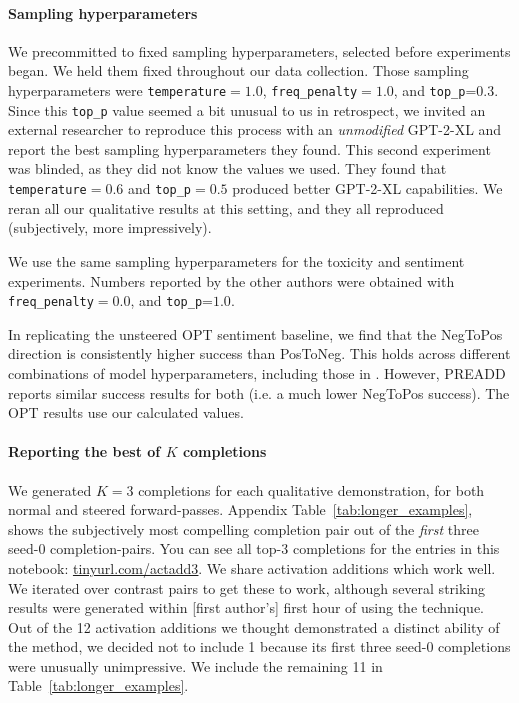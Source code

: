\documentclass{article}
\theoremstyle{plain}
\theoremstyle{definition}
\theoremstyle{remark}
\begin{document}
\paragraph{Sampling hyperparameters} We precommitted to fixed sampling hyperparameters, selected before experiments began. We held them fixed throughout our data collection. Those sampling hyperparameters were \texttt{temperature}$=1.0$, \texttt{freq\_penalty}$=1.0$, and \texttt{top\_p}=$0.3$. 
Since this \texttt{top\_p} value seemed a bit unusual to us in retrospect, we invited an external researcher
to reproduce this process with an \textit{unmodified} GPT-2-XL and report the best sampling hyperparameters they found. This second experiment was blinded, as they did not know the values we used. They found that \texttt{temperature}$=0.6$ and \texttt{top\_p}$=0.5$ produced better GPT-2-XL capabilities. We reran all our qualitative results at this setting, and they all reproduced (subjectively, more impressively).

We use the same sampling hyperparameters for the toxicity and sentiment experiments. Numbers reported by the other authors were obtained with \texttt{freq\_penalty}$=0.0$, and \texttt{top\_p}=$1.0$.

In replicating the unsteered OPT sentiment baseline, we find that the NegToPos direction is consistently higher success than PosToNeg. This holds across different combinations of model hyperparameters, including those in \citealt{pei2023preadd}. However, PREADD \citep{pei2023preadd} reports similar success results for both (i.e. a much lower NegToPos success). The OPT results use our calculated values. 

\paragraph{Reporting the best of $K$ completions} We generated $K=3$ completions for each qualitative demonstration, for both normal and steered forward-passes.
Appendix Table~\ref{tab:longer_examples}, shows the subjectively most compelling completion pair out of the \textit{first} three seed-$0$ completion-pairs. You can see all top-3 completions for the entries in this notebook: \underline{\href{https://tinyurl.com/actadd3}{tinyurl.com/actadd3}}. 
We share activation additions which work well. We iterated over contrast pairs to get these to work, although several striking results were generated within [first author's] first hour of using the technique. Out of the 12 activation additions we thought demonstrated a distinct ability of the method, we decided not to include 1 because its first three seed-$0$ completions were unusually unimpressive. We include the remaining 11 in Table~\ref{tab:longer_examples}.
\end{document}
